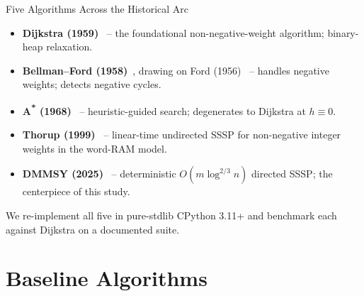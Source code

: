 \documentclass[aspectratio=169]{beamer}
\begin{document}
\begin{frame}{Five Algorithms Across the Historical Arc}
  \begin{itemize}
    \item \textbf{Dijkstra (1959)}~\cite{dijkstra1959note} -- the foundational non-negative-weight algorithm; binary-heap relaxation.
    \item \textbf{Bellman--Ford (1958)}~\cite{bellman1958routing}, drawing on Ford (1956)~\cite{ford1956network} -- handles negative weights; detects negative cycles.
    \item \textbf{A\textsuperscript{*} (1968)}~\cite{hart1968astar} -- heuristic-guided search; degenerates to Dijkstra at $h \equiv 0$.
    \item \textbf{Thorup (1999)}~\cite{thorup1999linear} -- linear-time undirected SSSP for non-negative integer weights in the word-RAM model.
    \item \textbf{DMMSY (2025)}~\cite{duan2025breaking} -- deterministic $O(m \log^{2/3} n)$ directed SSSP; \alert{the centerpiece of this study}.
  \end{itemize}

  \vskip 6pt
  We re-implement all five in pure-stdlib CPython 3.11+ and benchmark each against Dijkstra on a documented suite.
\end{frame}

\section{Baseline Algorithms}
\end{document}
